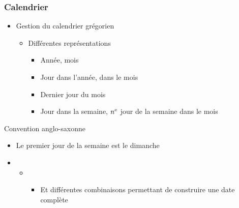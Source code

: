 \documentclass[C++.tex]{subfiles}
\begin{document}
\begin{frame}[fragile]
	\frametitle{Calendrier}
	\begin{itemize}
		\item Gestion du calendrier grégorien
		\begin{itemize}
			\item Différentes représentations
			\begin{itemize}
				\item Année, mois
				\item Jour dans l'année, dans le mois
				\item Dernier jour du mois
				\item Jour dans la semaine, $n\textsuperscript{e}$ jour de la semaine dans le mois
			\end{itemize}
		\end{itemize}
	\end{itemize}

	\begin{alertblock}{Convention anglo-saxonne}
		\begin{itemize}
			\item Le premier jour de la semaine est le dimanche
		\end{itemize}
	\end{alertblock}

	\begin{itemize}
		\item [] \begin{itemize}
			\item [] \begin{itemize}
				\item Et différentes combinaisons permettant de construire une date complète
			\end{itemize}
		\end{itemize}
	\end{itemize}
\end{frame}
\end{document}
